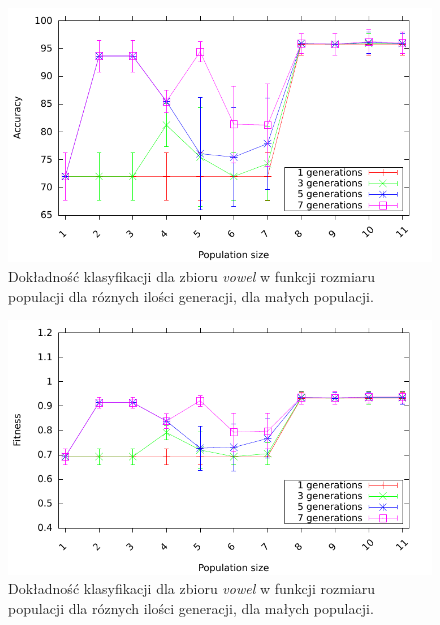 \documentclass{article}
\begin{document}
		\begin{figure}[ht]
		\includegraphics[scale=0.90]{figures/accuracy-vowel-detailed}
		\caption{Dokładność klasyfikacji dla zbioru \emph{vowel} w funkcji rozmiaru populacji dla róznych ilości generacji, dla małych populacji.\label{fig:acc-vowel-detailed}}
		\end{figure}
		
		\begin{figure}[ht]
		\includegraphics[scale=0.90]{figures/fitness-vowel-detailed}
		\caption{Dokładność klasyfikacji dla zbioru \emph{vowel} w funkcji rozmiaru populacji dla róznych ilości generacji, dla małych populacji.\label{fig:fit-vowel-detailed}}
		\end{figure}
	
\end{document}
